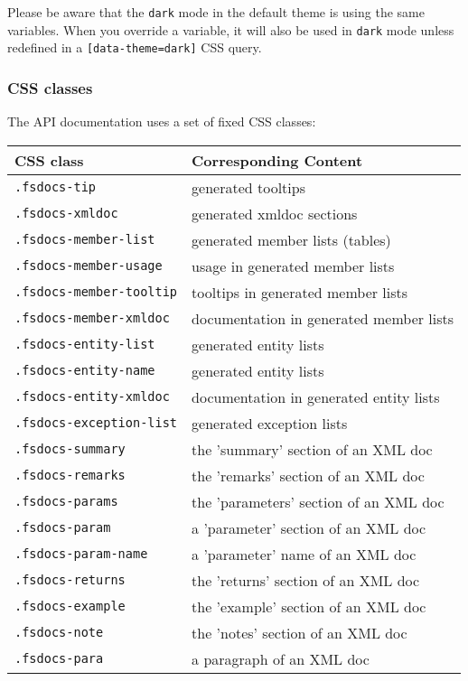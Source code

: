\documentclass{article}
\begin{document}
Please be aware that the \texttt{dark} mode in the default theme is using the same variables.
When you override a variable, it will also be used in \texttt{dark} mode unless redefined in a \texttt{[data-theme=dark]} CSS query.
\subsubsection*{CSS classes}



The API documentation uses a set of fixed CSS classes:
\begin{tabular}{|l|l|}\hline
\textbf{CSS class} & \textbf{Corresponding Content}\\ \hline\hline
\texttt{.fsdocs-tip} & generated tooltips\\ \hline
\texttt{.fsdocs-xmldoc} & generated xmldoc sections\\ \hline
\texttt{.fsdocs-member-list} & generated member lists (tables)\\ \hline
\texttt{.fsdocs-member-usage} & usage in generated member lists\\ \hline
\texttt{.fsdocs-member-tooltip} & tooltips in generated member lists\\ \hline
\texttt{.fsdocs-member-xmldoc} & documentation in generated member lists\\ \hline
\texttt{.fsdocs-entity-list} & generated entity lists\\ \hline
\texttt{.fsdocs-entity-name} & generated entity lists\\ \hline
\texttt{.fsdocs-entity-xmldoc} & documentation in generated entity lists\\ \hline
\texttt{.fsdocs-exception-list} & generated exception lists\\ \hline
\texttt{.fsdocs-summary} & the 'summary' section of an XML doc\\ \hline
\texttt{.fsdocs-remarks} & the 'remarks' section of an XML doc\\ \hline
\texttt{.fsdocs-params} & the 'parameters' section of an XML doc\\ \hline
\texttt{.fsdocs-param} & a 'parameter' section of an XML doc\\ \hline
\texttt{.fsdocs-param-name} & a 'parameter' name of an XML doc\\ \hline
\texttt{.fsdocs-returns} & the 'returns' section of an XML doc\\ \hline
\texttt{.fsdocs-example} & the 'example' section of an XML doc\\ \hline
\texttt{.fsdocs-note} & the 'notes' section of an XML doc\\ \hline
\texttt{.fsdocs-para} & a paragraph of an XML doc\\ \hline
\end{tabular}
\end{document}
